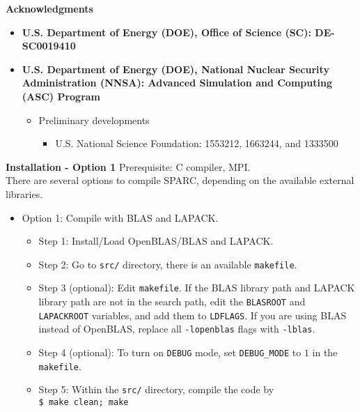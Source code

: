   
  \begin{frame}[allowframebreaks]{\textbf{Acknowledgments}} \label{Acknowledgments}
  
  \begin{itemize}
      \item \textbf{U.S. Department of Energy (DOE), Office of Science (SC): DE-SC0019410} \\
      \item \textbf{U.S. Department of Energy (DOE), National Nuclear Security Administration (NNSA): Advanced Simulation and Computing (ASC) Program} \\
      \vspace{10pt}
      \begin{itemize}
          \item Preliminary developments
          \begin{itemize}
              \item U.S. National Science Foundation: 1553212, 1663244, and 1333500
          \end{itemize}
      \end{itemize}
      
      
  \end{itemize}
  
  \end{frame}
  
  \begin{frame}{\textbf{Installation - Option 1}} \label{Installation:1}
  Prerequisite: C compiler, MPI.\\
  There are several options to compile SPARC, depending on the available external libraries.
  \begin{itemize}
  \item Option 1: Compile with BLAS and LAPACK.
    \begin{itemize}
      \item Step 1: Install/Load OpenBLAS/BLAS and LAPACK.
      \item Step 2: Go to \texttt{src/} directory, there is an available \texttt{makefile}.
      \item Step 3 (optional): Edit \texttt{makefile}. If the BLAS library path and LAPACK library path are not in the search path, edit the \texttt{BLASROOT} and \texttt{LAPACKROOT} variables, and add them to \texttt{LDFLAGS}. If you are using BLAS instead of OpenBLAS, replace all \texttt{-lopenblas} flags with \texttt{-lblas}.
      \item Step 4 (optional): To turn on \texttt{DEBUG} mode, set \texttt{DEBUG\_MODE} to $1$ in the \texttt{makefile}.
      \item Step 5: Within the \texttt{src/} directory, compile the code by \\
            \texttt{\$ make clean; make}
    \end{itemize}
  \end{itemize}
  \end{frame}
  
